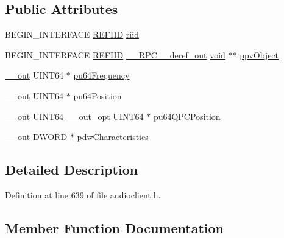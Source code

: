 \subsection*{Public Attributes}
\begin{DoxyCompactItemize}
\item 
B\+E\+G\+I\+N\+\_\+\+I\+N\+T\+E\+R\+F\+A\+CE \hyperlink{px__win__ds_8c_a80ec49c8ae61e234197d5071d2df497d}{R\+E\+F\+I\+ID} \hyperlink{struct_i_audio_clock_vtbl_ae5112c231e7b7a6e97176edcd69bf501}{riid}
\item 
B\+E\+G\+I\+N\+\_\+\+I\+N\+T\+E\+R\+F\+A\+CE \hyperlink{px__win__ds_8c_a80ec49c8ae61e234197d5071d2df497d}{R\+E\+F\+I\+ID} \hyperlink{rpcsal_8h_a23bc188526f10656f9c79d950f6c3192}{\+\_\+\+\_\+\+R\+P\+C\+\_\+\+\_\+deref\+\_\+out} \hyperlink{sound_8c_ae35f5844602719cf66324f4de2a658b3}{void} $\ast$$\ast$ \hyperlink{struct_i_audio_clock_vtbl_ab2d1d14b2a915f06f8153a3b85436a09}{ppv\+Object}
\item 
\hyperlink{sal_8h_abb4c3c1135aab6c47cff22e7c16efb74}{\+\_\+\+\_\+out} U\+I\+N\+T64 $\ast$ \hyperlink{struct_i_audio_clock_vtbl_a3cf7801c2293359f52ba908eb4454c0b}{pu64\+Frequency}
\item 
\hyperlink{sal_8h_abb4c3c1135aab6c47cff22e7c16efb74}{\+\_\+\+\_\+out} U\+I\+N\+T64 $\ast$ \hyperlink{struct_i_audio_clock_vtbl_a46f5530e76bd1ede82bef1acaf025588}{pu64\+Position}
\item 
\hyperlink{sal_8h_abb4c3c1135aab6c47cff22e7c16efb74}{\+\_\+\+\_\+out} U\+I\+N\+T64 \hyperlink{sal_8h_a1ab4597e9d0c9bcc3f676c58b25019fe}{\+\_\+\+\_\+out\+\_\+opt} U\+I\+N\+T64 $\ast$ \hyperlink{struct_i_audio_clock_vtbl_a1b2d08a23c0bdaa3dea369057be0ea56}{pu64\+Q\+P\+C\+Position}
\item 
\hyperlink{sal_8h_abb4c3c1135aab6c47cff22e7c16efb74}{\+\_\+\+\_\+out} \hyperlink{mapinls_8h_ad342ac907eb044443153a22f964bf0af}{D\+W\+O\+RD} $\ast$ \hyperlink{struct_i_audio_clock_vtbl_ace378c6c5b7862f015146a3581891dcc}{pdw\+Characteristics}
\end{DoxyCompactItemize}


\subsection{Detailed Description}


Definition at line 639 of file audioclient.\+h.



\subsection{Member Function Documentation}
